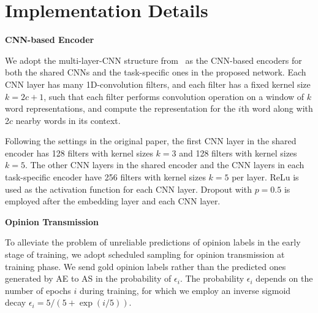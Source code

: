 \documentclass[11pt,a4paper]{article}
\begin{document}
\appendix
\section{Implementation Details}
\label{sec:enc}

\textbf{CNN-based Encoder}

\noindent We adopt the multi-layer-CNN structure from~\citep{hu:18} as the CNN-based encoders for both the shared CNNs and the task-specific ones in the proposed network. 
Each CNN layer has many 1D-convolution filters, and each filter has a fixed kernel size $k=2c+1$, such that each filter performs convolution operation on a window of $k$ word representations, and compute the representation for the $i$th word along with 2$c$ nearby words in its context.

Following the settings in the original paper, the first CNN layer in the shared encoder has 128 filters with kernel sizes $k=3$ and 128 filters with kernel sizes $k=5$. The other CNN layers in the shared encoder and the CNN layers in each task-specific encoder have 256 filters with kernel sizes $k=5$ per layer. ReLu is used as the activation function for each CNN layer. Dropout with $p=0.5$ is employed after the embedding layer and each CNN layer. 

\medskip

\noindent\textbf{Opinion Transmission}

\noindent To alleviate the problem of unreliable predictions of opinion labels in the early stage of training, we adopt scheduled sampling for opinion transmission at training phase. We send gold opinion labels rather than the predicted ones generated by AE to AS in the probability of $\epsilon_i$. The probability $\epsilon_i$ depends on the number of epochs $i$ during training, for which we employ an inverse sigmoid decay $\epsilon_i = 5/(5+\exp(i/5))$.
\end{document}
